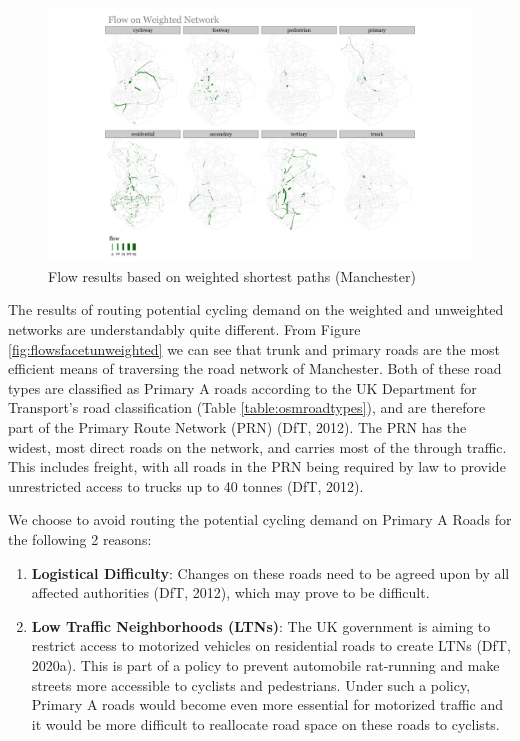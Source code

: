 \documentclass[
]{article}
\providecommand{\tightlist}{%
  \setlength{\itemsep}{0pt}\setlength{\parskip}{0pt}}
\begin{document}
\begin{figure}
\includegraphics[width=0.9\linewidth]{data/Manchester/Plots/flows_facet_weighted_Manchester} \caption{Flow results based on weighted shortest paths (Manchester)}\label{fig:flowsfacetweighted}
\end{figure}

The results of routing potential cycling demand on the weighted and unweighted networks are understandably quite different.
From Figure \ref{fig:flowsfacetunweighted} we can see that trunk and primary roads are the most efficient means of traversing the road network of Manchester.
Both of these road types are classified as Primary A roads according to the UK Department for Transport's road classification (Table \ref{table:osmroadtypes}), and are therefore part of the Primary Route Network (PRN) (DfT, 2012).
The PRN has the widest, most direct roads on the network, and carries most of the through traffic.
This includes freight, with all roads in the PRN being required by law to provide unrestricted access to trucks up to 40 tonnes (DfT, 2012).

We choose to avoid routing the potential cycling demand on Primary A Roads for the following 2 reasons:

\begin{enumerate}
\def\labelenumi{\arabic{enumi}.}
\tightlist
\item
  \textbf{Logistical Difficulty}: Changes on these roads need to be agreed upon by all affected authorities (DfT, 2012), which may prove to be difficult.
\item
  \textbf{Low Traffic Neighborhoods (LTNs)}: The UK government is aiming to restrict access to motorized vehicles on residential roads to create LTNs (DfT, 2020a). This is part of a policy to prevent automobile rat-running and make streets more accessible to cyclists and pedestrians. Under such a policy, Primary A roads would become even more essential for motorized traffic and it would be more difficult to reallocate road space on these roads to cyclists.
\end{enumerate}
\end{document}
